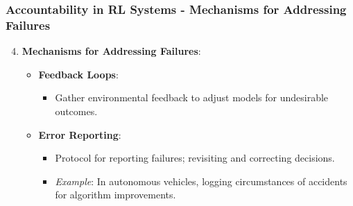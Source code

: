 \documentclass[aspectratio=169]{beamer}
\begin{document}
\begin{frame}[fragile]
    \frametitle{Accountability in RL Systems - Mechanisms for Addressing Failures}
    \begin{enumerate}
        \setcounter{enumi}{3}
        \item \textbf{Mechanisms for Addressing Failures}:
        \begin{itemize}
            \item \textbf{Feedback Loops}:
            \begin{itemize}
                \item Gather environmental feedback to adjust models for undesirable outcomes.
            \end{itemize}
            
            \item \textbf{Error Reporting}:
            \begin{itemize}
                \item Protocol for reporting failures; revisiting and correcting decisions.
                \item \textit{Example}: In autonomous vehicles, logging circumstances of accidents for algorithm improvements.
            \end{itemize}
        \end{itemize}
    \end{enumerate}
\end{frame}
\end{document}
